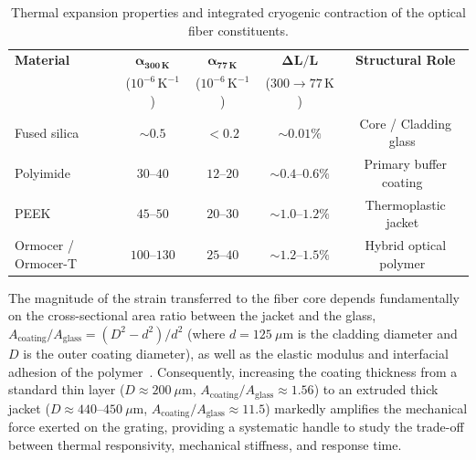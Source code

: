 \documentclass[preprint,11pt]{elsarticle}
\begin{document}
\begin{table}[htpb]
    \centering
    \footnotesize
    \setlength{\tabcolsep}{4.5pt}
    \caption{Thermal expansion properties and integrated cryogenic contraction of the optical fiber constituents.}
    \label{tab:material_cte}
    \begin{tabular}{lcccc}
        \toprule
        \textbf{Material} & $\boldsymbol{\alpha_{300\,\text{K}}}$ & $\boldsymbol{\alpha_{77\,\text{K}}}$ & $\boldsymbol{\Delta L/L}$ & \textbf{Structural Role} \\
                          & ($10^{-6}\,\text{K}^{-1}$)           & ($10^{-6}\,\text{K}^{-1}$)          & ($300\to 77\,\text{K}$)   &                          \\
        \midrule
        Fused silica        & $\sim 0.5$    & $< 0.2$   & $\sim 0.01\%$       & Core / Cladding glass~\cite{NIST_CryoMaterials} \\
        Polyimide           & $30$--$40$    & $12$--$20$ & $\sim 0.4$--$0.6\%$ & Primary buffer coating~\cite{Zhao2007,NIST_CryoMaterials} \\
        PEEK                & $45$--$50$    & $20$--$30$ & $\sim 1.0$--$1.2\%$ & Thermoplastic jacket~\cite{NIST_CryoMaterials} \\
        Ormocer / Ormocer-T & $100$--$130$  & $25$--$40$ & $\sim 1.2$--$1.5\%$ & Hybrid optical polymer~\cite{Popall1998} \\
        \bottomrule
    \end{tabular}
\end{table}

The magnitude of the strain transferred to the fiber core depends fundamentally on the cross-sectional area ratio between the jacket and the glass, $A_{\text{coating}}/A_{\text{glass}} = (D^2 - d^2)/d^2$ (where $d = 125~\mu\text{m}$ is the cladding diameter and $D$ is the outer coating diameter), as well as the elastic modulus and interfacial adhesion of the polymer~\cite{Bock2004,Zhao2007}. Consequently, increasing the coating thickness from a standard thin layer ($D \approx 200~\mu\text{m}$, $A_{\text{coating}}/A_{\text{glass}} \approx 1.56$) to an extruded thick jacket ($D \approx 440$--$450~\mu\text{m}$, $A_{\text{coating}}/A_{\text{glass}} \approx 11.5$) markedly amplifies the mechanical force exerted on the grating, providing a systematic handle to study the trade-off between thermal responsivity, mechanical stiffness, and response time.


\end{document}
